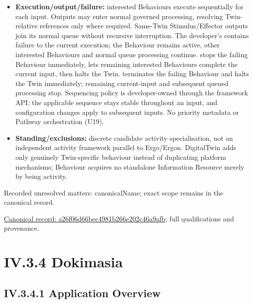 \begin{itemize}
\item \textbf{Execution/output/failure:} interested Behaviours execute sequentially for
  each input. Outputs may enter normal governed processing, resolving Twin-relative
  references only where required. Same-Twin Stimulus/Effector outputs join its
  normal queue without recursive interruption. The developer's
  \texttt{} contains failure to the current execution; the
  Behaviour remains active, other interested Behaviours and normal queue processing
  continue. \texttt{} stops the failing Behaviour immediately,
  lets remaining interested Behaviours complete the current input, then halts
  the Twin. \texttt{} terminates the failing Behaviour and halts
  the Twin immediately; remaining current-input and subsequent queued processing
  stop. Sequencing policy is developer-owned through the framework API; the
  applicable sequence stays stable throughout an input, and configuration changes
  apply to subsequent inputs. No priority metadata or Pathway orchestration (U19).

\item \textbf{Standing/exclusions:} discrete candidate activity specialisation, not an
  independent activity framework parallel to Ergo/Ergon. DigitalTwin adds only
  genuinely Twin-specific behaviour instead of duplicating platform mechanisms;
  Behaviour acquires no standalone Information Resource merely by being activity.

\end{itemize}

{\small Recorded unresolved matters: canonicalName; exact scope remains in the canonical record.}\par
{\footnotesize \href{../../../../../../../continuum/application/application-component/a26f06d66bec4981b266e202c46a9afb.md}{Canonical record: a26f06d66bec4981b266e202c46a9afb}; full qualifications and provenance.}\par
\section*{IV.3.4 Dokimasia}
\label{navigation:IV.3.4}

\subsection*{IV.3.4.1 Application Overview}
\label{navigation:IV.3.4.1}

